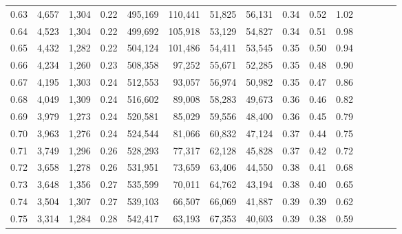 \begin{tabular}{rrrcrrrrrrrrrrr}
0.63 &   4,657 &   1,304 &                                       0.22 &  495,169 &  110,441 &   51,825 &   56,131 &  0.34 &  0.52 &                         1.02 \\
0.64 &   4,523 &   1,304 &                                       0.22 &  499,692 &  105,918 &   53,129 &   54,827 &  0.34 &  0.51 &                         0.98 \\
0.65 &   4,432 &   1,282 &                                       0.22 &  504,124 &  101,486 &   54,411 &   53,545 &  0.35 &  0.50 &                         0.94 \\
0.66 &   4,234 &   1,260 &                                       0.23 &  508,358 &   97,252 &   55,671 &   52,285 &  0.35 &  0.48 &                         0.90 \\
0.67 &   4,195 &   1,303 &                                       0.24 &  512,553 &   93,057 &   56,974 &   50,982 &  0.35 &  0.47 &                         0.86 \\
0.68 &   4,049 &   1,309 &                                       0.24 &  516,602 &   89,008 &   58,283 &   49,673 &  0.36 &  0.46 &                         0.82 \\
0.69 &   3,979 &   1,273 &                                       0.24 &  520,581 &   85,029 &   59,556 &   48,400 &  0.36 &  0.45 &                         0.79 \\
0.70 &   3,963 &   1,276 &                                       0.24 &  524,544 &   81,066 &   60,832 &   47,124 &  0.37 &  0.44 &                         0.75 \\
0.71 &   3,749 &   1,296 &                                       0.26 &  528,293 &   77,317 &   62,128 &   45,828 &  0.37 &  0.42 &                         0.72 \\
0.72 &   3,658 &   1,278 &                                       0.26 &  531,951 &   73,659 &   63,406 &   44,550 &  0.38 &  0.41 &                         0.68 \\
0.73 &   3,648 &   1,356 &                                       0.27 &  535,599 &   70,011 &   64,762 &   43,194 &  0.38 &  0.40 &                         0.65 \\
0.74 &   3,504 &   1,307 &                                       0.27 &  539,103 &   66,507 &   66,069 &   41,887 &  0.39 &  0.39 &                         0.62 \\
0.75 &   3,314 &   1,284 &                                       0.28 &  542,417 &   63,193 &   67,353 &   40,603 &  0.39 &  0.38 &                         0.59 \\

\end{tabular}
